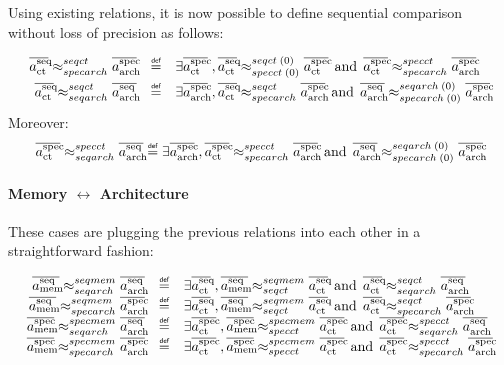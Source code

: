 \documentclass[12pt]{article}
\begin{document}
Using existing relations, it is now possible to define sequential comparison without loss of precision as follows:

\[
  \begin{array}{rcl}
    \seqctTrace\seqctTOspecarchtr\specarchTrace &\isdef& \exists \specctTrace\;,
        \seqctTrace\seqctTOspeccttr{0}{0}\specctTrace
      \;\operatorname{and}\;
        \specctTrace\specctTOspecarchtr\specarchTrace
    \\[1ex]
    \seqctTrace\seqctTOseqarchtr\seqarchTrace &\isdef& \exists \specarchTrace\;,
        \seqctTrace\seqctTOspecarchtr\specarchTrace
      \;\operatorname{and}\;
        \seqarchTrace\seqarchTOspecarchtr{0}{0}\specarchTrace
  \end{array}
\]
Moreover:
\[
  \specctTrace\specctTOseqarchtr\seqarchTrace \isdef 
    \exists \specarchTrace\;,
      \specctTrace\specctTOspecarchtr\specarchTrace
    \;\operatorname{and}\;
      \seqarchTrace\seqarchTOspecarchtr{0}{0}\specarchTrace
\]

\paragraph{Memory $\leftrightarrow$ Architecture} $\;$\\
These cases are plugging the previous relations into each other in a straightforward fashion:

\[
  \begin{array}{rcl}
    \seqmemTrace\seqmemTOseqarchtr\seqarchTrace &\isdef&
      \exists \seqctTrace\;,
        \seqmemTrace\seqmemTOseqcttr\seqctTrace
      \;\operatorname{and}\;
        \seqctTrace\seqctTOseqarchtr\seqarchTrace
    \\
    \seqmemTrace\seqmemTOspecarchtr\specarchTrace &\isdef&
      \exists \seqctTrace\;,
        \seqmemTrace\seqmemTOseqcttr\seqctTrace
      \;\operatorname{and}\;
        \seqctTrace\seqctTOspecarchtr\specarchTrace
    \\
    \specmemTrace\specmemTOseqarchtr\seqarchTrace &\isdef&
      \exists \specctTrace\;,
        \specmemTrace\specmemTOspeccttr\specctTrace
      \;\operatorname{and}\;
        \specctTrace\specctTOseqarchtr\seqarchTrace
    \\
    \specmemTrace\specmemTOspecarchtr\specarchTrace &\isdef&
      \exists \specctTrace\;,
        \specmemTrace\specmemTOspeccttr\specctTrace
      \;\operatorname{and}\;
        \specctTrace\specctTOspecarchtr\specarchTrace
    \\
  \end{array}
\]
\end{document}
